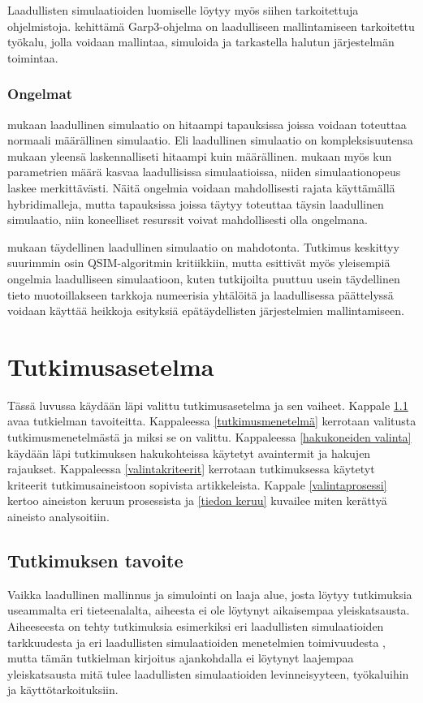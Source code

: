 \documentclass[utf8]{gradu3}
\begin{document}
Laadullisten simulaatioiden luomiselle löytyy myös siihen tarkoitettuja ohjelmistoja.
\textcite{bredeweg2007garp3} kehittämä Garp3-ohjelma on laadulliseen 
mallintamiseen tarkoitettu työkalu, jolla voidaan mallintaa, simuloida ja
tarkastella halutun järjestelmän toimintaa.

\subsection{Ongelmat}
\textcite{QualSimTheoryApplications2013} mukaan laadullinen simulaatio on hitaampi tapauksissa joissa voidaan toteuttaa normaali määrällinen simulaatio. Eli laadullinen simulaatio on kompleksisuutensa mukaan yleensä laskennalliseti hitaampi kuin määrällinen. 
\textcite{QualSimTheoryApplications2013} mukaan myös kun parametrien määrä kasvaa laadullisissa simulaatioissa, niiden simulaationopeus laskee merkittävästi. 
Näitä ongelmia voidaan mahdollisesti rajata käyttämällä hybridimalleja, mutta 
tapauksissa joissa täytyy toteuttaa täysin laadullinen simulaatio, niin koneelliset resurssit voivat mahdollisesti olla ongelmana. 

\textcite{soundQualSimImpossible} mukaan täydellinen laadullinen simulaatio on mahdotonta.
Tutkimus keskittyy suurimmin osin QSIM-algoritmin kritiikkiin, mutta \textcite{soundQualSimImpossible} esittivät myös yleisempiä ongelmia laadulliseen simulaatioon, kuten tutkijoilta puuttuu usein täydellinen tieto muotoillakseen tarkkoja numeerisia yhtälöitä ja laadullisessa päättelyssä voidaan käyttää heikkoja esityksiä epätäydellisten järjestelmien mallintamiseen.


\chapter{Tutkimusasetelma}
Tässä luvussa käydään läpi valittu tutkimusasetelma ja sen vaiheet. 
Kappale \ref{tavoite} avaa tutkielman tavoiteitta.
Kappaleessa \ref{tutkimusmenetelmä} kerrotaan valitusta tutkimusmenetelmästä 
ja miksi se on valittu. Kappaleessa \ref{hakukoneiden valinta} 
käydään läpi tutkimuksen hakukohteissa käytetyt avaintermit ja hakujen rajaukset.
Kappaleessa \ref{valintakriteerit} kerrotaan tutkimuksessa käytetyt kriteerit
tutkimusaineistoon sopivista artikkeleista. 
Kappale \ref{valintaprosessi} kertoo aineiston keruun prosessista ja 
\ref{tiedon keruu} kuvailee miten kerättyä aineisto analysoitiin.

 \section{Tutkimuksen tavoite} \label{tavoite}
Vaikka laadullinen mallinnus ja simulointi on laaja alue, 
josta löytyy tutkimuksia useammalta eri tieteenalalta, 
aiheesta ei ole löytynyt aikaisempaa yleiskatsausta. Aiheeseesta on tehty tutkimuksia esimerkiksi eri laadullisten simulaatioiden tarkkuudesta \parencite{FisherManagmentTechniques2024} ja eri laadullisten simulaatioiden menetelmien toimivuudesta \parencite{qualitativeSimTechniquesAssesment1992}, mutta tämän tutkielman kirjoitus ajankohdalla ei löytynyt laajempaa yleiskatsausta mitä tulee laadullisten simulaatioiden levinneisyyteen, työkaluihin ja käyttötarkoituksiin.  
\end{document}

